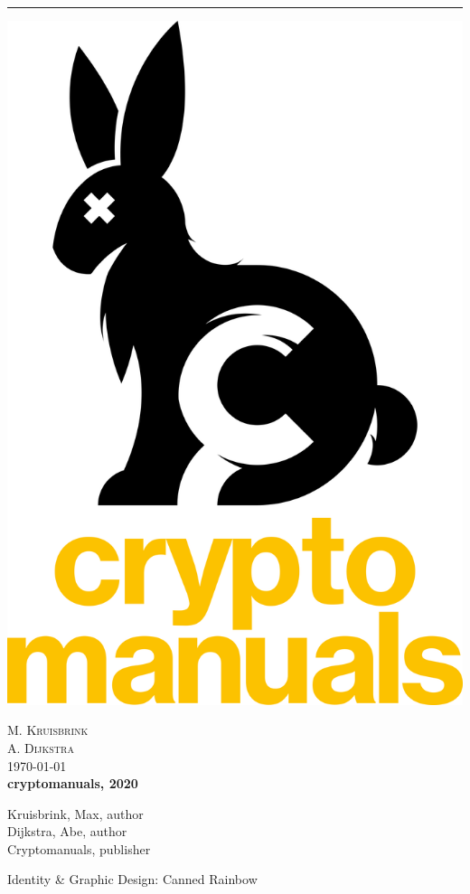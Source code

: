\begin{titlepage} %


\pagestyle{empty}
    
    \centering%
    
	\rule{1pt}{.9\textheight} %
	\hspace{0.05\textwidth} %
	\parbox[b]{0.85\textwidth}{ %
		
		\includegraphics[width=.3\textwidth]{logo/CRYPTO_M_PORT_1_BUNNY_B+TXT_LOGO_POS_RGB.png}
		
		\vspace{1cm}
			
		{\large\textsc{M. Kruisbrink}}\\ %
		{\large\textsc{A. Dijkstra}}\\[1\baselineskip] %
		\vspace{0.1\textheight} %
		{\today}\\
	
		
			\large{\textbf{cryptomanuals, 2020}}\\
			
			\vspace{.3cm}
			
            \small{Kruisbrink, Max, author\\ Dijkstra, Abe, author\\ Cryptomanuals, publisher}
            
            \vspace{.3cm}
			\small{Identity \& Graphic Design: Canned Rainbow}\\
			
}
\end{titlepage}
